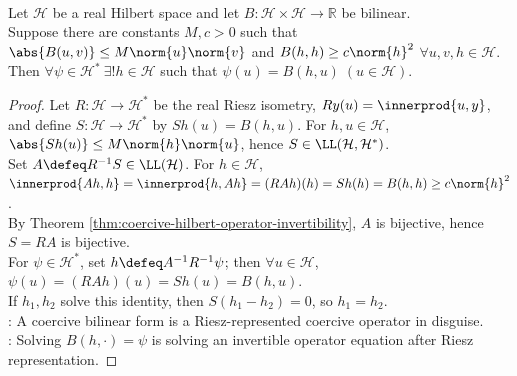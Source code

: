 \begin{theorem} \label{thm:lax-milgram-hilbert} \\
Let $\mathcal{H}$ be a real Hilbert space and let $B:\mathcal{H}\times\mathcal{H}\to\mathbb{R}$ be bilinear.\\
Suppose there are constants $M,c>0$ such that $\abs{B(u,v)}\leq M\norm{u}\norm{v}$ and $B(h,h)\geq c\norm{h}^2$ $\forall u,v,h\in\mathcal{H}$.\\
Then $\forall\psi\in\mathcal{H}^*\ \exists!h\in\mathcal{H}$ such that $\psi(u)=B(h,u)\;(u\in\mathcal{H}).$
\begin{proof}
Let $R:\mathcal{H}\to\mathcal{H}^*$ be the real Riesz isometry, $Ry(u)=\innerprod{u,y}$, and define $S:\mathcal{H}\to\mathcal{H}^*$ by $Sh(u)=B(h,u)$. For $h,u\in\mathcal H$, $\abs{Sh(u)}\leq M\norm{h}\norm{u}$, hence $S\in\LL(\mathcal H,\mathcal H^*)$.\\
Set $A\defeq R^{-1}S\in\LL(\mathcal H)$. For $h\in\mathcal H$, $\innerprod{Ah,h}=\innerprod{h,Ah}=(RAh)(h)=Sh(h)=B(h,h)\geq c\norm{h}^2$.\\
By Theorem \ref{thm:coercive-hilbert-operator-invertibility}, $A$ is bijective, hence $S=RA$ is bijective.\\
For $\psi\in\mathcal H^*$, set $h\defeq A^{-1}R^{-1}\psi$; then $\forall u\in\mathcal H$, $\psi(u)=(RAh)(u)=Sh(u)=B(h,u)$.\\
If $h_1,h_2$ solve this identity, then $S(h_1-h_2)=0$, so $h_1=h_2$.\\
: A coercive bilinear form is a Riesz-represented coercive operator in disguise.\\
: Solving $B(h,\cdot)=\psi$ is solving an invertible operator equation after Riesz representation.
\end{proof}
\end{theorem}

